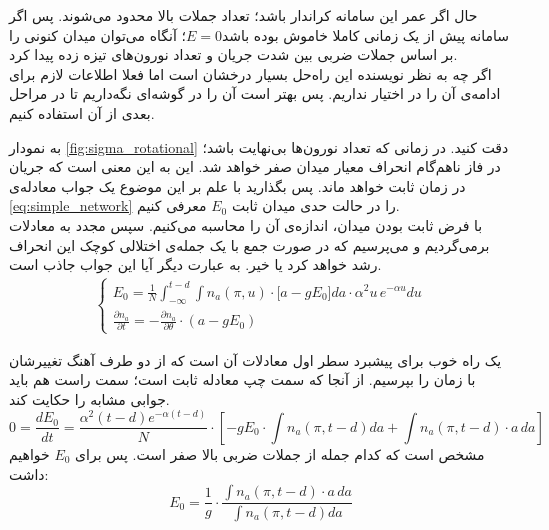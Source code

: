 \restoregeometry 

حال اگر عمر این سامانه کراندار باشد؛ تعداد جملات بالا محدود می‌شوند. پس اگر سامانه پیش از یک زمانی کاملا خاموش بوده باشد$E = 0$؛ آنگاه می‌توان میدان کنونی را بر اساس جملات ضربی بین شدت جریان و تعداد نورون‌های تیزه زده پیدا کرد.\\
اگر چه به نظر نویسنده این راه‌حل بسیار درخشان است اما فعلا اطلاعات لازم برای ادامه‌ی آن را در اختیار نداریم. پس بهتر است آن را در گوشه‌ای نگه‌داریم تا در مراحل بعدی از آن استفاده کنیم.


به نمودار \ref{fig:sigma_rotational} دقت کنید. در زمانی که تعداد نورون‌ها بی‌نهایت باشد؛ در فاز ناهم‌گام انحراف معیار میدان صفر خواهد شد. این به این معنی است که جریان در زمان ثابت خواهد ماند. پس بگذارید با علم بر این موضوع یک جواب معادله‌ی \ref{eq:simple_network} را در حالت حدی میدان ثابت $E_0$ معرفی کنیم.\\
با فرض ثابت بودن میدان، اندازه‌ی آن را محاسبه می‌کنیم. سپس مجدد به معادلات برمی‌گردیم و می‌پرسیم که در صورت جمع با یک جمله‌ی اختلالی کوچک این انحراف رشد خواهد کرد یا خیر. به عبارت دیگر آیا این جواب جاذب است.\\
\begin{align}
	\begin{cases}
		E_0 = \frac{1}{N}\int_{- \infty}^{t - d} \int n_a(\pi,u) \cdot \big[ a - g E_0 \big] da \cdot \alpha^2 u\, e^{-\alpha u} du \\
		\frac{\partial n_a}{\partial t} = - \frac{\partial n_a}{\partial \theta} \cdot (a - g E_0 )
	\end{cases}
\end{align}

یک راه خوب برای پیشبرد سطر اول معادلات آن است که از دو طرف آهنگ تغییرشان با زمان را بپرسیم. از آنجا که سمت چپ معادله ثابت است؛ سمت راست هم باید جوابی مشابه را حکایت کند.\\
\begin{equation}
	0 = \frac{dE_0}{dt} = \frac{\alpha^2 (t-d) e^{-\alpha (t-d)}}{N} \cdot [ - gE_0 \cdot \int n_a(\pi,t-d) da + \int n_a(\pi,t-d)\cdot a\,da ]
\end{equation}
مشخص است که کدام جمله از جملات ضربی بالا صفر است. پس برای $E_0$ خواهیم داشت:
\begin{equation}
	E_0 = \frac{1}{g}\cdot \frac{\int n_a(\pi,t-d)\cdot a\,da}{\int n_a(\pi,t-d) da }
\end{equation}

